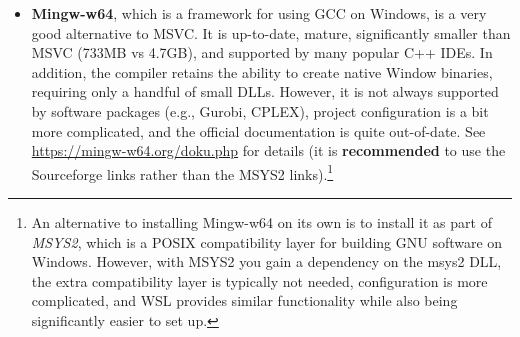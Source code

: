 \documentclass[12pt]{article}
\begin{document}
\begin{itemize}
\begin{itemize}
{                }
            \item \textbf{Mingw-w64}, which is a framework for using GCC on Windows, is a very good alternative to MSVC.
                It is up-to-date, mature, significantly smaller than MSVC (733MB vs 4.7GB), and supported by many popular C++ IDEs.
                In addition, the compiler retains the ability to create native Window binaries, requiring only a handful of small DLLs.
                However, it is not always supported by software packages (e.g., Gurobi, CPLEX), project configuration is a bit more complicated, and the official documentation is quite out-of-date.
                See \url{https://mingw-w64.org/doku.php} for details (it is \textbf{recommended} to use the Sourceforge links rather than the MSYS2 links).\footnote{
                    An alternative to installing Mingw-w64 on its own is to install it as part of \emph{MSYS2}, which is a POSIX compatibility layer for building GNU software on Windows.
                    However, with MSYS2 you gain a dependency on the msys2 DLL, the extra compatibility layer is typically not needed, configuration is more complicated, and WSL provides similar functionality while also being significantly easier to set up.
                }
        \end{itemize}
\end{itemize}
\end{document}

